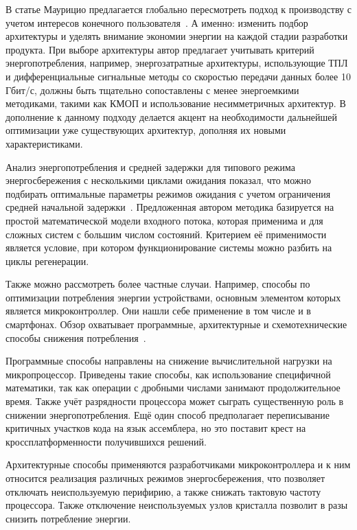 \documentclass[a4paper,14pt]{extarticle} %
\begin{document}
	В статье Маурицио предлагается глобально пересмотреть подход к производству с учетом интересов конечного пользователя~\parencite{маурицио2008переоценка}. А именно: изменить подбор архитектуры и уделять внимание экономии энергии на каждой стадии разработки продукта. При выборе архитектуры автор предлагает учитывать критерий энергопотребления, например, энергозатратные архитектуры, использующие ТПЛ и дифференциальные сигнальные методы со скоростью передачи данных более 10 Гбит/с, должны быть тщательно сопоставлены с менее энергоемкими методиками, такими как КМОП и использование несимметричных архитектур. В дополнение к данному подходу делается акцент на необходимости дальнейшей оптимизации уже существующих архитектур, дополняя их новыми характеристиками.
	
	Анализ энергопотребления и средней задержки для типового режима энергосбережения с несколькими циклами ожидания показал, что можно подбирать оптимальные параметры режимов ожидания с учетом ограничения средней начальной задержки~\parencite{пустовалов2013анализ}. Предложенная автором методика базируется на простой математической модели входного потока, которая применима и для сложных систем с большим числом состояний. Критерием её применимости является условие, при котором функционирование системы можно разбить на циклы регенерации.
	
	Также можно рассмотреть более частные случаи. Например, способы по оптимизации потребления энергии устройствами, основным элементом которых является микроконтроллер. Они нашли себе применение в том числе и в смартфонах. Обзор охватывает программные, архитектурные и схемотехнические способы снижения потребления~\parencite{кафтанников2013оптимизация}.
	
	Программные способы направлены на снижение вычислительной нагрузки на микропроцессор. Приведены такие способы, как использование специфичной математики, так как операции с дробными числами занимают продолжительное время. Также учёт разрядности процессора может сыграть существенную роль в снижении энергопотребления. Ещё один способ предполагает переписывание критичных участков кода на язык ассемблера, но это поставит крест на кроссплатформенности получившихся решений.
	
	Архитектурные способы применяются разработчиками микроконтроллера и к ним относится реализация различных режимов энергосбережения, что позволяет отключать неиспользуемую перифирию, а также снижать тактовую частоту процессора. Также отключение неиспользуемых узлов кристалла позволит в разы снизить потребление энергии.
	
\end{document}
